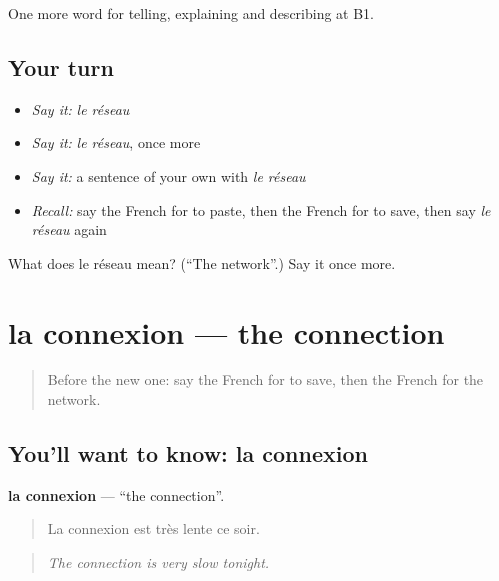 \begin{grammarlens}[title={What you've built}]
One more word for telling, explaining and describing at B1.
\end{grammarlens}

\subsection*{Your turn}
\begin{itemize}
\raggedright
  \item \emph{Say it:} \emph{le réseau}
  \item \emph{Say it:} \emph{le réseau}, once more
  \item \emph{Say it:} a sentence of your own with \emph{le réseau}
  \item \emph{Recall:} say the French for to paste, then the French for to save, then say \emph{le réseau} again
\end{itemize}

\begin{tcolorbox}[breakable,colback=teal!4,colframe=teal!35!black,title={Before you move on}]
What does le réseau mean? (\textquotedblleft{}The network\textquotedblright{}.) Say it once more.
\end{tcolorbox}
\section[la connexion]{la connexion — the connection}

\label{lesson:FR-C398-connexion}



\begin{quote}
Before the new one: say the French for to save, then the French for the network.
\end{quote}

\subsection*{You'll want to know: la connexion}
\textbf{la connexion} — \textquotedblleft{}the connection\textquotedblright{}.

\begin{quote}
La connexion est très lente ce soir.
\end{quote}

\begin{quote}
\emph{The connection is very slow tonight.}
\end{quote}

